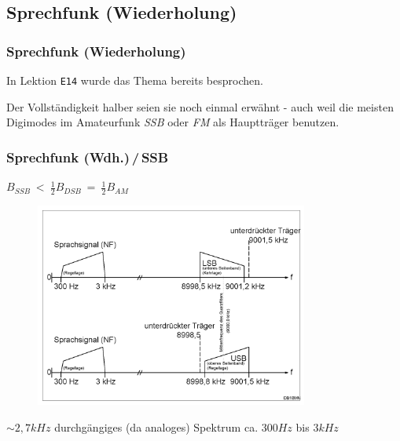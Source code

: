 \subsection[Sprechfunk (Wdh.)]{Sprechfunk (Wiederholung)}

\begin{frame}
  \frametitle{Sprechfunk (Wiederholung)}

  In Lektion \texttt{E14} wurde das Thema bereits besprochen.

  Der Vollständigkeit halber seien sie noch einmal erwähnt - auch weil die
  meisten Digimodes im Amateurfunk \emph{SSB} oder \emph{FM} als Hauptträger
  benutzen.

\end{frame}

\begin{frame}
  \frametitle{Sprechfunk (Wdh.)\,/\,SSB}


  \begin{center}
    $B_{SSB} ~ < ~ \frac{1}{2} B_{DSB} ~ = ~ \frac{1}{2} B_{AM}$ \\
    \begin{figure}
      \includegraphics[width=0.8\textwidth,height=.65\textheight,keepaspectratio]{e16/Ssb-de.png}
    \end{figure}
  \end{center}

  \centering
  $\sim 2,7 kHz$ durchgängiges (da analoges) Spektrum ca. $300 Hz$ bis $3 kHz$

\end{frame}

